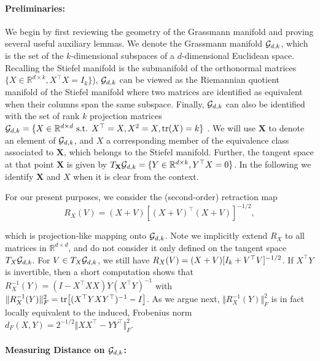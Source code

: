 \paragraph{Preliminaries:}
We begin by first reviewing the geometry of the Grassmann manifold and proving several useful auxiliary lemmas. We denote the  Grassmann manifold $\mathcal{G}_{d,k}$, which is the set of the $k$-dimensional subspaces of a $d$-dimensional Euclidean space. Recalling the Stiefel manifold is the submanifold of the orthonormal matrices $\{ X\in\mathbb{R}^{d\times k}, X^\top X=I_k\}$), $\mathcal{G}_{d,k}$ can be viewed as the Riemannian quotient manifold of the Stiefel manifold where two matrices are identified as equivalent when their columns span the same subspace. Finally, $\mathcal{G}_{d,k}$ can also be identified with the set of rank $k$ projection matrices $\mathcal{G}_{d,k}=\{ X \in \mathbb{R}^{d\times d} \text{ s.t. } X^\top=X, X^2=X, \tr(X)=k \}$ \citep[see, e.g.,][for further details]{edelman1998geometry,absil2004riemannian}. We will use $\mathbf{X}$ to denote an element of $\mathcal{G}_{d,k}$, and $X$ a corresponding member of the equivalence class associated to $\mathbf{X}$, which belongs to the Stiefel manifold. Further, the tangent space at that point $\mathbf X$ is given by $T_{\mathbf X}\mathcal{G}_{d,k}= \{ Y\in \mathbb{R}^{d\times k}, Y^\top X=0 \}$. In the following we identify $\mathbf X$ and $X$ when it is clear from the context.

For our present purposes, we consider the (second-order) retraction map
\begin{equation}\label{eq:retraproj}
R_X(V)=(X+V)[(X+V)^\top(X+V)]^{-1/2},
\end{equation}

which is projection-like mapping onto $\mathcal{G}_{d,k}$. Note we implicitly extend $R_X$ to all matrices in $\mathbb{R}^{d\times d}$, and do not consider it only defined on the tangent space $T_X\mathcal{G}_{d,k}$. For $V \in T_X\mathcal{G}_{d,k}$, we still have $R_X(V)=(X+V)[I_k+V^\top V]^{-1/2}$.  If $X^\top Y$ is invertible, then a short computation shows that $R_X^{-1}(Y)=(I-X^\top X X)Y(X^\top Y)^{-1}$ with $\Vert R_X^{-1}(Y)\Vert_F^2=\tr [( X^\top Y X Y^\top)^{-1}-I]$. As we argue next, $\Vert R_X^{-1}(Y)\Vert_F^2$ is in fact locally equivalent to the induced, Frobenius norm $d_F(X,Y)=2^{-1/2}\Vert X X^\top-Y Y^\top\Vert_F^2$.

\paragraph{Measuring Distance on $\mathcal{G}_{d,k}$:}

